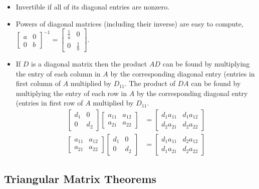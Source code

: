 \documentclass[12pt]{article}
\begin{document}
\begin{itemize}
    \item Invertible if all of its diagonal entries are nonzero.
    \item Powers of diagonal matrices (including their inverse) are easy to compute, $\begin{bmatrix}a&0\\0&b\end{bmatrix}^{-1} = \begin{bmatrix}\frac{1}{a} & 0\\0 & \frac{1}{b}\end{bmatrix}$.
    \item If $D$ is a diagonal matrix then the product $AD$ can be found by multiplying the entry of each column in $A$ by the corresponding diagonal entry (entries in first column of $A$ multiplied by $D_{11}$. The product of $DA$ can be found by multiplying the entry of each row in $A$ by the corresponding diagonal entry (entries in first row of $A$ multiplied by $D_{11}$.
        \begin{align*}
            \begin{bmatrix}d_1&0\\0&d_2\end{bmatrix}\begin{bmatrix}a_{11}&a_{12}\\a_{21}&a_{22}\end{bmatrix} &= \begin{bmatrix}d_1a_{11}&d_1a_{12}\\d_2a_{21}&d_2a_{22}\end{bmatrix}\\
            \begin{bmatrix}a_{11}&a_{12}\\a_{21}&a_{22}\end{bmatrix}\begin{bmatrix}d_1&0\\0&d_2\end{bmatrix} &= \begin{bmatrix}d_1a_{11}&d_2a_{12}\\d_1a_{21}&d_2a_{22}\end{bmatrix}
        \end{align*}
\end{itemize}


\subsection{Triangular Matrix Theorems}
\end{document}
